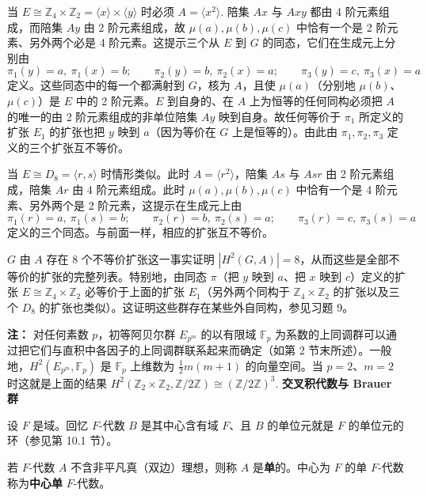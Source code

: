 当 \(E \cong \mathbb{Z}_4 \times \mathbb{Z}_2 = \langle x\rangle \times \langle y\rangle\) 时必须 \(A = \langle x^2\rangle\). 陪集 \(Ax\) 与 \(Axy\) 都由 4 阶元素组成，而陪集 \(Ay\) 由 2 阶元素组成，故 \(\mu(a), \mu(b), \mu(c)\) 中恰有一个是 2 阶元素、另外两个必是 4 阶元素。这提示三个从 \(E\) 到 \(G\) 的同态，它们在生成元上分别由
\[
\pi_1(y) = a,\ \pi_1(x) = b; \qquad \pi_2(y) = b,\ \pi_2(x) = a; \qquad \pi_3(y) = c,\ \pi_3(x) = a
\]
定义。这些同态中的每一个都满射到 \(G\)，核为 \(A\)，且使 \(\mu(a)\)（分别地 \(\mu(b)\)、\(\mu(c)\)）是 \(E\) 中的 2 阶元素。\(E\) 到自身的、在 \(A\) 上为恒等的任何同构必须把 \(A\) 的唯一的由 2 阶元素组成的非单位陪集 \(Ay\) 映到自身。故任何等价于 \(\pi_1\) 所定义的扩张 \(E_1\) 的扩张也把 \(y\) 映到 \(a\)（因为等价在 \(G\) 上是恒等的）。由此由 \(\pi_1, \pi_2, \pi_3\) 定义的三个扩张互不等价。

当 \(E \cong D_8 = \langle r, s\rangle\) 时情形类似。此时 \(A = \langle r^2\rangle\)，陪集 \(As\) 与 \(Asr\) 由 2 阶元素组成，陪集 \(Ar\) 由 4 阶元素组成。此时 \(\mu(a), \mu(b), \mu(c)\) 中恰有一个是 4 阶元素、另外两个是 2 阶元素，这提示在生成元上由
\[
\pi_1(r) = a,\ \pi_1(s) = b; \qquad \pi_2(r) = b,\ \pi_2(s) = a; \qquad \pi_3(r) = c,\ \pi_3(s) = a
\]
定义的三个同态。与前面一样，相应的扩张互不等价。

\(G\) 由 \(A\) 存在 8 个不等价扩张这一事实证明 \(|H^2(G, A)| = 8\)，从而这些是全部不等价的扩张的完整列表。特别地，由同态 \(\pi\)（把 \(y\) 映到 \(a\)、把 \(x\) 映到 \(c\)）定义的扩张 \(E \cong \mathbb{Z}_4 \times \mathbb{Z}_2\) 必等价于上面的扩张 \(E_1\)（另外两个同构于 \(\mathbb{Z}_4 \times \mathbb{Z}_2\) 的扩张以及三个 \(D_8\) 的扩张也类似）。这证明这些群存在某些外自同构，参见习题 9。

\noindent\textbf{注：} 对任何素数 \(p\)，初等阿贝尔群 \(E_{p^m}\) 的以有限域 \(\mathbb{F}_p\) 为系数的上同调群可以通过把它们与直积中各因子的上同调群联系起来而确定（如第 2 节末所述）。一般地，\(H^2(E_{p^m}, \mathbb{F}_p)\) 是 \(\mathbb{F}_p\) 上维数为 \(\frac{1}{2}m(m+1)\) 的向量空间。当 \(p = 2\)、\(m = 2\) 时这就是上面的结果 \(H^2(\mathbb{Z}_2 \times \mathbb{Z}_2, \mathbb{Z}/2\mathbb{Z}) \cong (\mathbb{Z}/2\mathbb{Z})^3\).
\noindent\textbf{交叉积代数与 Brauer 群}

设 \(F\) 是域。回忆 \(F\)-代数 \(B\) 是其中心含有域 \(F\)、且 \(B\) 的单位元就是 \(F\) 的单位元的环（参见第 10.1 节）。

\begin{definition}
若 \(F\)-代数 \(A\) 不含非平凡真（双边）理想，则称 \(A\) 是\textbf{单}的。中心为 \(F\) 的单 \(F\)-代数称为\textbf{中心单} \(F\)-代数。
\end{definition}


